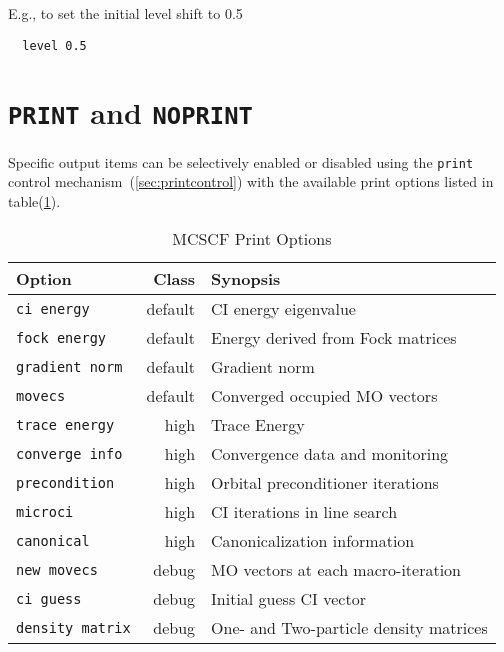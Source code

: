 E.g., to set the initial level shift to 0.5
\begin{verbatim}
  level 0.5
\end{verbatim}

\section{{\tt PRINT} and {\tt NOPRINT}}

Specific output items can be selectively enabled or disabled using the
\verb+print+ control mechanism~(\ref{sec:printcontrol}) with the
available print options listed in table(\ref{MCSCF_print_options}).

\begin{table}[htb]

\label{MCSCF_print_options}

\center

\vspace{.2in}
\begin{tabular}{lrl}
\hline\hline
Option                          & Class    &  Synopsis \\
\hline
\verb+ci energy+                & default  &  CI energy eigenvalue \\
\verb+fock energy+              & default  &  Energy derived from Fock matrices \\
\verb+gradient norm+            & default  &  Gradient norm \\
\verb+movecs+                   & default  &  Converged occupied MO vectors \\
\verb+trace energy+             & high     &  Trace Energy \\
\verb+converge info+            & high     &  Convergence data and monitoring \\
\verb+precondition+             & high     &  Orbital preconditioner iterations \\
\verb+microci+                  & high     &  CI iterations in line search \\
\verb+canonical+                & high     &  Canonicalization information \\
\verb+new movecs+               & debug    &  MO vectors at each macro-iteration \\
\verb+ci guess+                 & debug    &  Initial guess CI vector \\
\verb+density matrix+           & debug    &  One- and Two-particle density matrices \\
\hline\hline
\end{tabular}

\caption{MCSCF Print Options}

\end{table}



